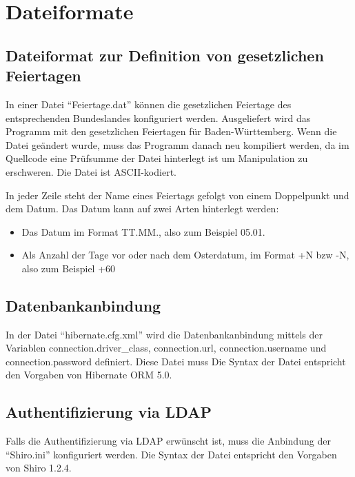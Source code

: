 \section{Dateiformate}
\subsection{Dateiformat zur Definition von gesetzlichen Feiertagen}
In einer Datei "`Feiertage.dat"' können die gesetzlichen Feiertage des entsprechenden Bundeslandes konfiguriert werden.
Ausgeliefert wird das Programm mit den gesetzlichen Feiertagen für Baden-Württemberg.
Wenn die Datei geändert wurde, muss das Programm danach neu kompiliert werden, da im Quellcode eine Prüfsumme der Datei hinterlegt ist um Manipulation zu erschweren.
Die Datei ist ASCII-kodiert.

In jeder Zeile steht der Name eines Feiertags gefolgt von einem Doppelpunkt und dem Datum.
Das Datum kann auf zwei Arten hinterlegt werden:
\begin{itemize}
    \item Das Datum im Format TT.MM., also zum Beispiel 05.01.
    \item Als Anzahl der Tage vor oder nach dem Osterdatum, im Format +N bzw -N, also zum Beispiel +60
\end{itemize}

\subsection{Datenbankanbindung}
In der Datei "`hibernate.cfg.xml"' wird die Datenbankanbindung mittels der Variablen connection.driver\_class, connection.url, connection.username und connection.password definiert.
Diese Datei muss
Die Syntax der Datei entspricht den Vorgaben von Hibernate ORM 5.0.

\subsection{Authentifizierung via LDAP}
Falls die Authentifizierung via LDAP erwünscht ist, muss die Anbindung der "`Shiro.ini"' konfiguriert werden.
Die Syntax der Datei entspricht den Vorgaben von Shiro 1.2.4.
